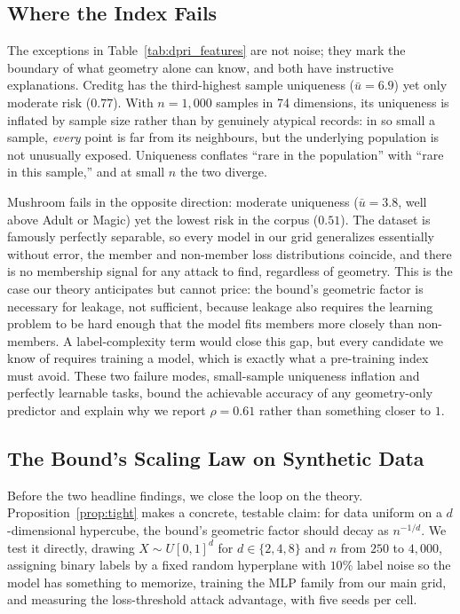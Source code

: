 \subsection{Where the Index Fails}
\label{sec:failures}

The exceptions in Table~\ref{tab:dpri_features} are not noise; they mark
the boundary of what geometry alone can know, and both have instructive
explanations. Creditg has the third-highest sample uniqueness
($\bar{u}=6.9$) yet only moderate risk ($0.77$). With $n=1{,}000$
samples in 74 dimensions, its uniqueness is inflated by sample size
rather than by genuinely atypical records: in so small a sample,
\emph{every} point is far from its neighbours, but the underlying
population is not unusually exposed. Uniqueness conflates ``rare in the
population'' with ``rare in this sample,'' and at small $n$ the two
diverge.

Mushroom fails in the opposite direction: moderate uniqueness
($\bar{u}=3.8$, well above Adult or Magic) yet the lowest risk in the
corpus ($0.51$). The dataset is famously perfectly separable, so every
model in our grid generalizes essentially without error, the
member and non-member loss distributions coincide, and there is no
membership signal for any attack to find, regardless of geometry. This
is the case our theory anticipates but cannot price: the bound's
geometric factor is necessary for leakage, not sufficient, because
leakage also requires the learning problem to be hard enough that the
model fits members more closely than non-members. A label-complexity
term would close this gap, but every candidate we know of requires
training a model, which is exactly what a pre-training index must avoid.
These two failure modes, small-sample uniqueness inflation and
perfectly learnable tasks, bound the achievable accuracy of any
geometry-only predictor and explain why we report $\rho = 0.61$ rather
than something closer to $1$.

\subsection{The Bound's Scaling Law on Synthetic Data}
\label{sec:tightness_main}

Before the two headline findings, we close the loop on the theory.
Proposition~\ref{prop:tight} makes a concrete, testable claim: for data
uniform on a $d$-dimensional hypercube, the bound's geometric factor
should decay as $n^{-1/d}$. We test it directly, drawing
$X \sim U[0,1]^d$ for $d \in \{2,4,8\}$ and $n$ from $250$ to $4{,}000$,
assigning binary labels by a fixed random hyperplane with $10\%$ label
noise so the model has something to memorize, training the MLP family
from our main grid, and measuring the loss-threshold attack advantage,
with five seeds per cell.

